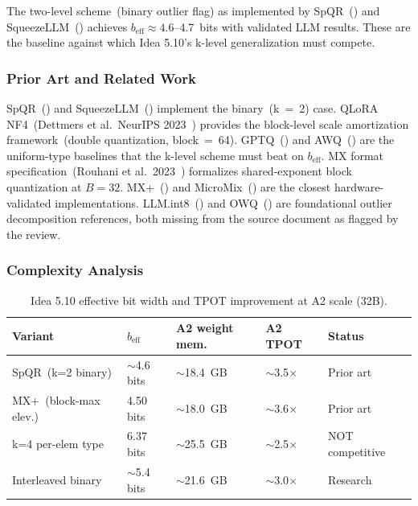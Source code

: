 \documentclass[11pt]{article}
\begin{document}
The two-level scheme~(binary outlier flag) as implemented by SpQR~(\cite{DettmersSpQR2024}) and SqueezeLLM~(\cite{KimSqueezeLLM2023}) achieves $b_{\text{eff}}{\approx}4.6$--4.7~bits with validated LLM results. These are the baseline against which Idea 5.10's k-level generalization must compete.

\subsubsection*{Prior Art and Related Work}

SpQR~(\cite{DettmersSpQR2024}) and SqueezeLLM~(\cite{KimSqueezeLLM2023}) implement the binary~(k~=~2) case. QLoRA NF4~(Dettmers et al.\ NeurIPS 2023~\cite{DettmersQLoRA2023}) provides the block-level scale amortization framework~(double quantization, block~=~64). GPTQ~(\cite{FrantarGPTQ2023}) and AWQ~(\cite{LinAWQ2024}) are the uniform-type baselines that the k-level scheme must beat on $b_{\text{eff}}$. MX format specification~(Rouhani et al.\ 2023~\cite{RouhaniMX2023}) formalizes shared-exponent block quantization at $B{=}32$. MX+~(\cite{LeeMXplus2025}) and MicroMix~(\cite{LiuMicroMix2025}) are the closest hardware-validated implementations. LLM.int8~(\cite{DettmersLLMint8}) and OWQ~(\cite{LeeOWQ2024}) are foundational outlier decomposition references, both missing from the source document as flagged by the review.

\subsubsection*{Complexity Analysis}

\begin{table}[h]
\centering
\caption{Idea 5.10 effective bit width and TPOT improvement at A2 scale (32B).}
\small
\begin{tabular}{lllll}
\toprule
Variant & $b_{\text{eff}}$ & A2 weight mem. & A2 TPOT & Status \\
\midrule
SpQR~(k=2 binary) & $\sim$4.6 bits & $\sim$18.4~GB & $\sim$3.5$\times$ & Prior art \\
MX+~(block-max elev.) & 4.50 bits & $\sim$18.0~GB & $\sim$3.6$\times$ & Prior art \\
k=4 per-elem type & 6.37 bits & $\sim$25.5~GB & $\sim$2.5$\times$ & NOT competitive \\
Interleaved binary & $\sim$5.4 bits & $\sim$21.6~GB & $\sim$3.0$\times$ & Research \\
\bottomrule
\end{tabular}
\end{table}
\end{document}
